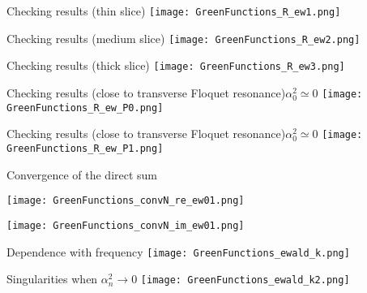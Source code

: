 \begin{frame}{Checking results (thin slice)}
  \texttt{[image: GreenFunctions\_R\_ew1.png]}
\end{frame}
\begin{frame}{Checking results (medium slice)}
  \texttt{[image: GreenFunctions\_R\_ew2.png]}
\end{frame}
\begin{frame}{Checking results (thick slice)}
  \texttt{[image: GreenFunctions\_R\_ew3.png]}
\end{frame}
\begin{frame}{Checking results (close to transverse Floquet resonance)}{$\alpha^2_0 \simeq 0$}
  \texttt{[image: GreenFunctions\_R\_ew\_P0.png]}
\end{frame}
\begin{frame}{Checking results (close to transverse Floquet 
  resonance)}{$\alpha^2_0 \simeq 0$}
  \texttt{[image: GreenFunctions\_R\_ew\_P1.png]}
\end{frame}
\begin{frame}[allowframebreaks]{Convergence of the direct sum}

  \texttt{[image: GreenFunctions\_convN\_re\_ew01.png]}
 
  \framebreak

  \texttt{[image: GreenFunctions\_convN\_im\_ew01.png]}
\end{frame}
\begin{frame}{Dependence with frequency}
  \texttt{[image: GreenFunctions\_ewald\_k.png]}
\end{frame}
\begin{frame}{Singularities when $\alpha_n^2 \to 0$}
  \texttt{[image: GreenFunctions\_ewald\_k2.png]}
\end{frame}


